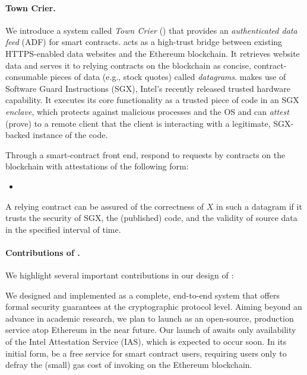 \paragraph{\bf Town Crier.} We introduce a system called \emph{Town Crier} (\tc) that provides an \emph{authenticated data feed} (ADF) for smart contracts. \tc acts as a high-trust bridge between existing HTTPS-enabled data websites and the Ethereum blockchain. It retrieves website data and serves it to relying contracts on the blockchain as concise, contract-consumable pieces of data (e.g., stock quotes) called \emph{datagrams}. \tc makes use of Software Guard Instructions (SGX),  Intel's recently released trusted hardware capability. It executes its core functionality as a trusted piece of code in an SGX \emph{enclave}, which protects against malicious processes and the OS and can \emph{attest} (prove) to a remote client that the client is interacting with a legitimate, SGX-backed instance of the \tc code. 

Through a smart-contract front end, \tcs respond to requests by contracts on the blockchain with attestations of the following form:

\begin{itemize}[leftmargin=3mm]
\item[]
\end{itemize}

A relying contract can be assured of the correctness of $X$ in such a datagram if it trusts the security of SGX, the (published) \tc code, and the validity of source data in the specified interval of time.

\paragraph{Contributions of \tc.}
We highlight several important contributions in our design of \tc:

\vspace{2mm}
We designed and implemented \tcs as a complete, end-to-end system that offers formal security guarantees
at the cryptographic protocol level. Aiming beyond an advance in academic research, we plan to launch \tcs
as an open-source, production service atop Ethereum in the near future. Our launch of \tc awaits only availability of the Intel Attestation Service (IAS), which is expected to occur soon. In its initial form, \tcs be a free service for smart contract users, requiring users only to defray the (small) gas cost of invoking \tc on the Ethereum blockchain. 

